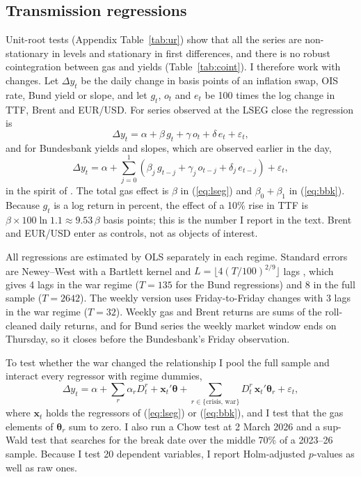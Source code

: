 \documentclass[11pt,a4paper]{article}
\begin{document}
\subsection{Transmission regressions}

Unit-root tests (Appendix Table~\ref{tab:ur}) show that all the series are non-stationary in levels and stationary in
first differences, and there is no robust cointegration between gas and yields (Table~\ref{tab:coint}). I therefore
work with changes. Let $\Delta y_t$ be the daily change in basis points of an inflation swap, OIS rate, Bund yield or
slope, and let $g_t$, $o_t$ and $e_t$ be 100 times the log change in TTF, Brent and EUR/USD. For series observed at the
LSEG close the regression is
\begin{equation}\label{eq:lseg}
\Delta y_t = \alpha + \beta\, g_t + \gamma\, o_t + \delta\, e_t + \varepsilon_t ,
\end{equation}
and for Bundesbank yields and slopes, which are observed earlier in the day,
\begin{equation}\label{eq:bbk}
\Delta y_t = \alpha + \sum_{j=0}^{1}\left(\beta_j\, g_{t-j} + \gamma_j\, o_{t-j} + \delta_j\, e_{t-j}\right) + \varepsilon_t ,
\end{equation}
in the spirit of \citet{dimson1979}. The total gas effect is $\beta$ in (\ref{eq:lseg}) and $\beta_0+\beta_1$ in
(\ref{eq:bbk}). Because $g_t$ is a log return in percent, the effect of a 10\% rise in TTF is $\beta \times 100\ln 1.1
\approx 9.53\,\beta$ basis points; this is the number I report in the text. Brent and EUR/USD enter as controls, not as
objects of interest.

All regressions are estimated by OLS separately in each regime. Standard errors are Newey--West with a Bartlett kernel
and $L=\lfloor 4(T/100)^{2/9}\rfloor$ lags \citep{neweywest1987}, which gives 4 lags in the war regime
($T=135$ for the Bund regressions) and 8 in the full sample ($T=2642$). The weekly version
uses Friday-to-Friday changes with 3 lags in the war regime ($T=32$). Weekly gas and Brent returns
are sums of the roll-cleaned daily returns, and for Bund series the weekly market window ends on Thursday, so it closes
before the Bundesbank's Friday observation.

To test whether the war changed the relationship I pool the full sample and interact every regressor with regime
dummies,
\begin{equation}\label{eq:inter}
\Delta y_t = \alpha + \sum_{r} \alpha_r D^r_t + \mathbf{x}_t'\boldsymbol\theta + \sum_{r\in\{\text{crisis},\,\text{war}\}} D^r_t\, \mathbf{x}_t'\boldsymbol\theta_r + \varepsilon_t ,
\end{equation}
where $\mathbf{x}_t$ holds the regressors of (\ref{eq:lseg}) or (\ref{eq:bbk}), and I test that the gas elements of
$\boldsymbol\theta_r$ sum to zero. I also run a Chow test at 2 March 2026 and a \citet{andrews1993} sup-Wald test that
searches for the break date over the middle 70\% of a 2023--26 sample. Because I test 20 dependent variables, I report
Holm-adjusted $p$-values \citep{holm1979} as well as raw ones.
\end{document}
